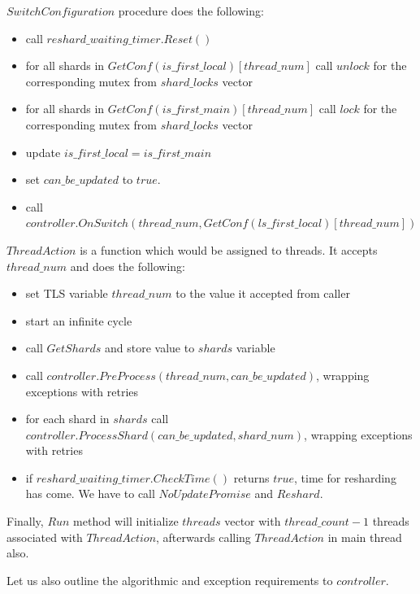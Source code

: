\documentclass{article}
\begin{document}
$SwitchConfiguration$ procedure does the following:
\begin{itemize}
	\item call $reshard\_waiting\_timer.Reset()$
	\item for all shards in $GetConf(is\_first\_local)[thread\_num]$ call $unlock$ for the corresponding mutex from $shard\_locks$ vector
	\item for all shards in $GetConf(is\_first\_main)[thread\_num]$ call $lock$ for the corresponding mutex from $shard\_locks$ vector
	\item update $is\_first\_local = is\_first\_main$
	\item set $can\_be\_updated$ to $true$.
	\item call $controller.OnSwitch(thread\_num, GetConf(ls\_first\_local)[thread\_num])$
\end{itemize}

$ThreadAction$ is a function which would be assigned to threads. It accepts $thread\_num$ and does the following:
\begin{itemize}
	\item set TLS variable $thread\_num$ to the value it accepted from caller
	\item start an infinite cycle
	\item call $GetShards$ and store value to $shards$ variable
	\item call $controller.PreProcess(thread\_num, can\_be\_updated)$, wrapping exceptions with retries
	\item for each shard in $shards$ call $controller.ProcessShard(can\_be\_updated, shard\_num)$, wrapping exceptions with retries
	\item if $reshard\_waiting\_timer.CheckTime()$ returns $true$, time for resharding has come. We have to call $NoUpdatePromise$ and $Reshard$.
\end{itemize}

Finally, $Run$ method will initialize $threads$ vector with $thread\_count - 1$ threads associated with $ThreadAction$, afterwards calling $ThreadAction$ in main thread also.

Let us also outline the algorithmic and exception requirements to $controller$.
\end{document}
